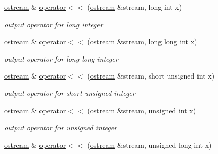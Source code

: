 \begin{DoxyCompactItemize}
\mbox{\label{classhwlib_1_1ostream_af269c1256dc5c755fafc13a7b9125187}} 
\hyperlink{classhwlib_1_1ostream}{ostream} \& \hyperlink{classhwlib_1_1ostream_af269c1256dc5c755fafc13a7b9125187}{operator$<$$<$} (\hyperlink{classhwlib_1_1ostream}{ostream} \&stream, long int x)
\begin{DoxyCompactList}\small\item\em output operator for long integer \end{DoxyCompactList}\item 
\mbox{\label{classhwlib_1_1ostream_a25a0b9be93f8f9ed789cef2411acbed2}} 
\hyperlink{classhwlib_1_1ostream}{ostream} \& \hyperlink{classhwlib_1_1ostream_a25a0b9be93f8f9ed789cef2411acbed2}{operator$<$$<$} (\hyperlink{classhwlib_1_1ostream}{ostream} \&stream, long long int x)
\begin{DoxyCompactList}\small\item\em output operator for long long integer \end{DoxyCompactList}\item 
\mbox{\label{classhwlib_1_1ostream_a2c5c3586c979f880097499e392bcbf54}} 
\hyperlink{classhwlib_1_1ostream}{ostream} \& \hyperlink{classhwlib_1_1ostream_a2c5c3586c979f880097499e392bcbf54}{operator$<$$<$} (\hyperlink{classhwlib_1_1ostream}{ostream} \&stream, short unsigned int x)
\begin{DoxyCompactList}\small\item\em output operator for short unsigned integer \end{DoxyCompactList}\item 
\mbox{\label{classhwlib_1_1ostream_ae70e52926d415af7bfd483c29322f6a1}} 
\hyperlink{classhwlib_1_1ostream}{ostream} \& \hyperlink{classhwlib_1_1ostream_ae70e52926d415af7bfd483c29322f6a1}{operator$<$$<$} (\hyperlink{classhwlib_1_1ostream}{ostream} \&stream, unsigned int x)
\begin{DoxyCompactList}\small\item\em output operator for unsigned integer \end{DoxyCompactList}\item 
\mbox{\label{classhwlib_1_1ostream_a7df95ef6e7402e0238681b5a0ee1a4f6}} 
\hyperlink{classhwlib_1_1ostream}{ostream} \& \hyperlink{classhwlib_1_1ostream_a7df95ef6e7402e0238681b5a0ee1a4f6}{operator$<$$<$} (\hyperlink{classhwlib_1_1ostream}{ostream} \&stream, unsigned long int x)

\end{DoxyCompactItemize}
